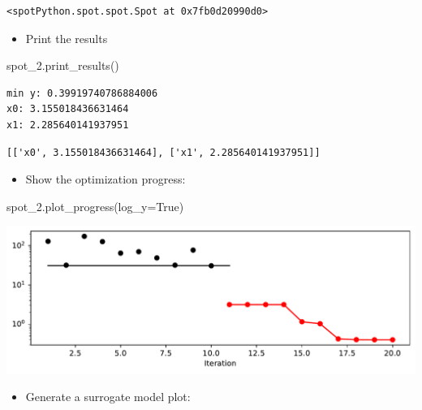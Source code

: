 \documentclass[
  letterpaper,
  DIV=11,
  numbers=noendperiod]{scrreprt}
\newenvironment{Shaded}{\begin{snugshade}}{\end{snugshade}}
\newcommand{\NormalTok}[1]{\textcolor[rgb]{0.00,0.23,0.31}{#1}}
\newcommand{\OperatorTok}[1]{\textcolor[rgb]{0.37,0.37,0.37}{#1}}
\newcommand{\VariableTok}[1]{\textcolor[rgb]{0.07,0.07,0.07}{#1}}
\providecommand{\tightlist}{%
  \setlength{\itemsep}{0pt}\setlength{\parskip}{0pt}}\usepackage{longtable,booktabs,array}
\begin{document}
\begin{verbatim}
<spotPython.spot.spot.Spot at 0x7fb0d20990d0>
\end{verbatim}

\begin{itemize}
\tightlist
\item
  Print the results
\end{itemize}

\begin{Shaded}
\begin{Highlighting}[]
\NormalTok{spot\_2.print\_results()}
\end{Highlighting}
\end{Shaded}

\begin{verbatim}
min y: 0.39919740786884006
x0: 3.155018436631464
x1: 2.285640141937951
\end{verbatim}

\begin{verbatim}
[['x0', 3.155018436631464], ['x1', 2.285640141937951]]
\end{verbatim}

\begin{itemize}
\tightlist
\item
  Show the optimization progress:
\end{itemize}

\begin{Shaded}
\begin{Highlighting}[]
\NormalTok{spot\_2.plot\_progress(log\_y}\OperatorTok{=}\VariableTok{True}\NormalTok{)}
\end{Highlighting}
\end{Shaded}

\includegraphics{010_num_spot_sklearn_surrogate_files/figure-pdf/cell-32-output-1.pdf}

\begin{itemize}
\tightlist
\item
  Generate a surrogate model plot:
\end{itemize}
\end{document}
